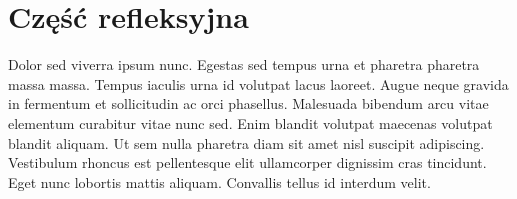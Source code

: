 \documentclass[12pt, titlepage]{article}
\begin{document}
\pagebreak
\section{Część refleksyjna}
Dolor sed viverra ipsum nunc. Egestas sed tempus urna et pharetra pharetra massa massa. Tempus iaculis urna id volutpat lacus laoreet. Augue neque gravida in fermentum et sollicitudin ac orci phasellus. Malesuada bibendum arcu vitae elementum curabitur vitae nunc sed. Enim blandit volutpat maecenas volutpat blandit aliquam. Ut sem nulla pharetra diam sit amet nisl suscipit adipiscing. Vestibulum rhoncus est pellentesque elit ullamcorper dignissim cras tincidunt. Eget nunc lobortis mattis aliquam. Convallis tellus id interdum velit.
\end{document}
